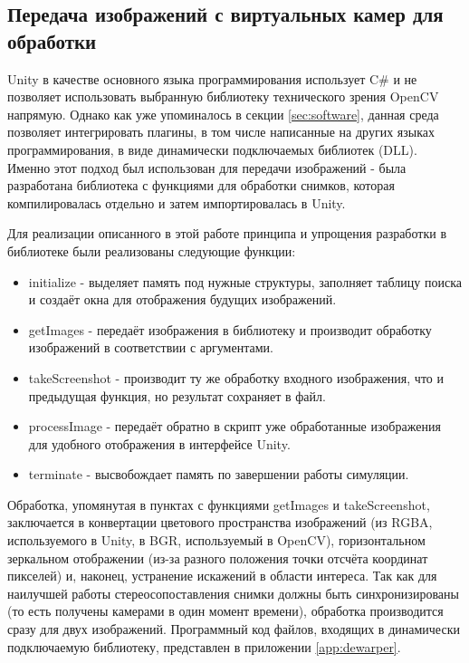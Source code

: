 \subsection{Передача изображений с виртуальных камер для обработки}
Unity в качестве основного языка программирования использует C\# и не позволяет использовать 
выбранную библиотеку технического зрения OpenCV напрямую. Однако как уже упоминалось в секции 
\ref{sec:software}, данная среда позволяет интегрировать плагины, в том числе написанные на 
других языках программирования, в виде динамически подключаемых библиотек (DLL). Именно этот 
подход был использован для передачи изображений - была разработана библиотека с функциями для 
обработки снимков, которая компилировалась отдельно и затем импортировалась в Unity. 

Для реализации описанного в этой работе принципа и упрощения разработки в библиотеке были реализованы 
следующие функции:
\begin{itemize}
    \item initialize - выделяет память под нужные структуры, заполняет таблицу поиска и создаёт окна 
    для отображения будущих изображений.
    \item getImages - передаёт изображения в библиотеку и производит обработку изображений в 
    соответствии с аргументами. 
    \item takeScreenshot - производит ту же обработку входного изображения, что и предыдущая функция,
     но результат сохраняет в файл. 
    \item processImage - передаёт обратно в скрипт уже обработанные изображения для удобного отображения
    в интерфейсе Unity. 
    \item terminate - высвобождает память по завершении работы симуляции.      
\end{itemize}
Обработка, упомянутая в пунктах с функциями getImages и takeScreenshot, заключается в конвертации 
цветового пространства изображений (из RGBA, используемого в Unity, в BGR, используемый в OpenCV), 
горизонтальном зеркальном отображении (из-за разного положения точки отсчёта координат пикселей)
и, наконец, устранение искажений в области интереса. Так как для наилучшей работы стереосопоставления
снимки должны быть синхронизированы (то есть получены камерами в один момент времени), обработка 
производится сразу для двух изображений. Программный код файлов, входящих в динамически 
подключаемую библиотеку, представлен в приложении \ref{app:dewarper}.

